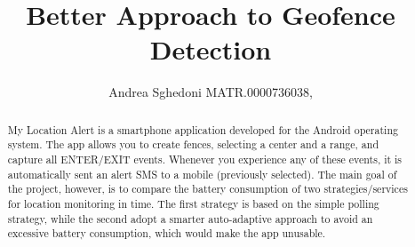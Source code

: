 \documentclass[conference]{IEEEtran}
\begin{document}
\title{Better Approach to Geofence Detection}

\author{
Andrea Sghedoni MATR.0000736038,
\\
}




\maketitle

\begin{abstract}
My Location Alert is a smartphone application developed for the Android operating system.
The app allows you to create fences, selecting a center and a range, and capture all ENTER/EXIT events.
Whenever you experience any of these events, it is automatically sent an alert SMS to a mobile (previously selected).
The main goal of the project, however, is to compare the battery consumption of two strategies/services for location monitoring in time.
The first strategy is based on the simple polling strategy, while the second adopt a smarter auto-adaptive approach to avoid an excessive battery consumption, which would make the app unusable.

\end{abstract}
\end{document}
